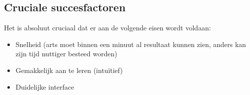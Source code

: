 \subsection{Cruciale succesfactoren}

Het is absoluut cruciaal dat er aan de volgende eisen wordt voldaan:
\begin{itemize}
    \item Snelheid (arts moet binnen een minuut al resultaat kunnen zien, anders kan zijn tijd nuttiger besteed worden)
    \item Gemakkelijk aan te leren (intu\"itief)
    \item Duidelijke interface
\end{itemize}

\pagebreak